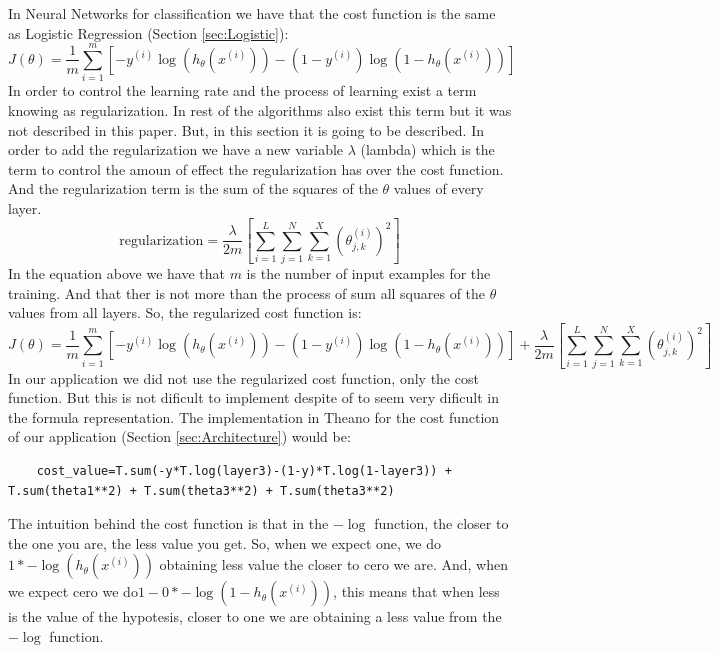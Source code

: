 \documentclass[12pt]{article}
\begin{document}
In Neural Networks for classification we have that the cost function is the same as Logistic Regression (Section \ref{sec:Logistic}):
\begin{equation}
  J(\theta)=\frac{1}{m} \displaystyle\sum_{i=1}^{m} [-y^{(i)}\log(h_{\theta}(x^{(i)}))-(1-y^{(i)})\log(1 -h_{\theta}(x^{(i)}))]
\end{equation}
In order to control the learning rate and the process of learning exist a term knowing as regularization. In rest of the algorithms also exist this term but it was not described in this paper. But, in this section it is going to be described. In order to add the regularization we have a new variable $\lambda$ (lambda) which is the term to control the amoun of effect the regularization has over the cost function. And the regularization term is the sum of the squares of the $\theta$ values of every layer.
\begin{equation}
  \textrm{regularization}=\frac{\lambda}{2m} [\displaystyle\sum_{i=1}^{L}\displaystyle\sum_{j=1}^{N}\displaystyle\sum_{k=1}^{X} (\theta_{j,k}^{(i)})^2]
\end{equation}
In the equation above we have that $m$ is the number of input examples for the training. And that ther is not more than the process of sum all squares of the $\theta$ values from all layers. So, the regularized cost function is:
\begin{equation}
  J(\theta)=\frac{1}{m} \displaystyle\sum_{i=1}^{m} [-y^{(i)}\log(h_{\theta}(x^{(i)}))-(1-y^{(i)})\log(1 -h_{\theta}(x^{(i)}))] +\frac{\lambda}{2m} [\displaystyle\sum_{i=1}^{L}\displaystyle\sum_{j=1}^{N}\displaystyle\sum_{k=1}^{X} (\theta_{j,k}^{(i)})^2]
\end{equation}
In our application we did not use the regularized cost function, only the cost function. But this is not dificult to implement despite of to seem very dificult in the formula representation. The implementation in Theano for the cost function of our application (Section \ref{sec:Architecture}) would be:
\begin{lstlisting}
	cost_value=T.sum(-y*T.log(layer3)-(1-y)*T.log(1-layer3)) + T.sum(theta1**2) + T.sum(theta3**2) + T.sum(theta3**2)
\end{lstlisting}
The intuition behind the cost function is that in the $-\log$ function, the closer to the one you are, the less value you get. So, when we expect one, we do $1*-\log(h_{\theta}(x^{(i)}))$ obtaining less value the closer to cero we are. And, when we expect cero we do$1-0 * -\log(1-h_{\theta}(x^{(i)}))$, this means that when less is the value of the hypotesis, closer to one we are obtaining a less value from the $-\log$ function.
\end{document}
